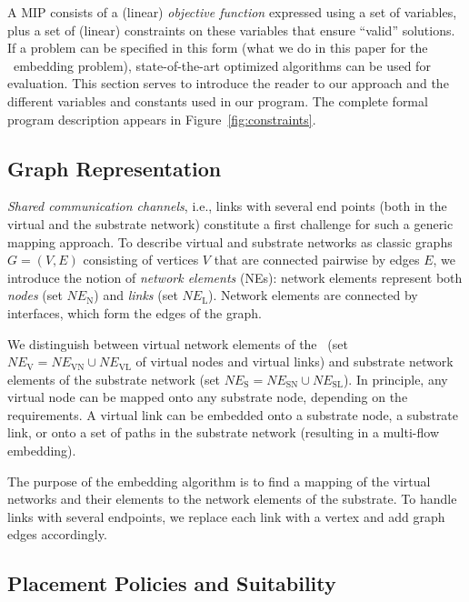 \documentclass[conference,10pt]{IEEEtran}
\newcommand{\CloudNet}{\text{CloudNet}}
\newcommand{\mrm}{\mathrm}
\begin{document}
A MIP consists of a (linear) \emph{objective function} expressed
using a set of variables, plus a set of (linear) constraints on
these variables that ensure ``valid'' solutions. If a problem can be
specified in this form (what we do in this paper for the \CloudNet\
embedding problem), state-of-the-art optimized algorithms can be
used for evaluation. This section serves to introduce the reader to
our approach and the different variables and constants used in our
program. The complete formal program description appears in
Figure~\ref{fig:constraints}.


\subsection{Graph Representation}\label{ssec:defs}


\emph{Shared communication channels}, i.e., links with several end
points (both in the virtual and the substrate network) constitute a
first challenge for such a generic mapping approach.
To describe virtual and substrate networks as classic graphs $G=(V,E)$
consisting of vertices $V$ that are connected pairwise by edges $E$,
we introduce the notion of \emph{network elements} (NEs):
network elements represent both \emph{nodes} (set $NE_\mrm{N}$) and \emph{links}
(set $NE_\mrm{L}$). Network elements are connected by interfaces, which
form the edges of the graph.

We distinguish between virtual network elements of the \CloudNet\
(set $NE_\mrm{V}=NE_{\mrm{VN}}\cup NE_{\mrm{VL}}$ of virtual nodes and virtual links)
and substrate network elements of the substrate network (set
$NE_\mrm{S}=NE_{\mrm{SN}}\cup NE_{\mrm{SL}}$). In principle, any virtual node can be
mapped onto any substrate node, depending on the
requirements. A virtual link can be embedded onto a substrate node,
a substrate link, or onto a set of paths in the substrate network
(resulting in a multi-flow embedding).


The purpose of the embedding algorithm is to find a mapping of the
virtual networks and their elements to the network elements of the
substrate. To handle links with several endpoints, we replace
each link with a vertex and add graph edges accordingly.



\subsection{Placement Policies and Suitability} \label{ssec:map:approach:policies}
\end{document}
